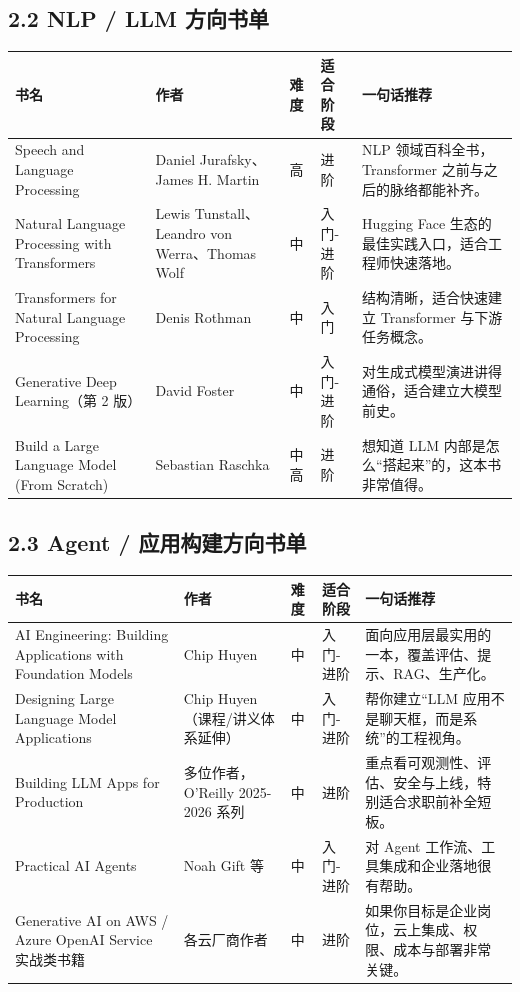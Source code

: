 \subsection{2.2 NLP / LLM 方向书单}

\begingroup
\scriptsize
\setlength{\tabcolsep}{3pt}
\begin{longtable}{|p{}|p{}|p{}|p{}|p{}|}
\hline
书名 & 作者 & 难度 & 适合阶段 & 一句话推荐 \\ \hline
Speech and Language Processing & Daniel Jurafsky、James H. Martin & 高 & 进阶 & NLP 领域百科全书，Transformer 之前与之后的脉络都能补齐。 \\ \hline
Natural Language Processing with Transformers & Lewis Tunstall、Leandro von Werra、Thomas Wolf & 中 & 入门-进阶 & Hugging Face 生态的最佳实践入口，适合工程师快速落地。 \\ \hline
Transformers for Natural Language Processing & Denis Rothman & 中 & 入门 & 结构清晰，适合快速建立 Transformer 与下游任务概念。 \\ \hline
Generative Deep Learning（第 2 版） & David Foster & 中 & 入门-进阶 & 对生成式模型演进讲得通俗，适合建立大模型前史。 \\ \hline
Build a Large Language Model (From Scratch) & Sebastian Raschka & 中高 & 进阶 & 想知道 LLM 内部是怎么``搭起来''的，这本书非常值得。 \\ \hline
\end{longtable}
\endgroup

\subsection{2.3 Agent / 应用构建方向书单}

\begingroup
\scriptsize
\setlength{\tabcolsep}{3pt}
\begin{longtable}{|p{}|p{}|p{}|p{}|p{}|}
\hline
书名 & 作者 & 难度 & 适合阶段 & 一句话推荐 \\ \hline
AI Engineering: Building Applications with Foundation Models & Chip Huyen & 中 & 入门-进阶 & 面向应用层最实用的一本，覆盖评估、提示、RAG、生产化。 \\ \hline
Designing Large Language Model Applications & Chip Huyen（课程/讲义体系延伸） & 中 & 入门-进阶 & 帮你建立``LLM 应用不是聊天框，而是系统''的工程视角。 \\ \hline
Building LLM Apps for Production & 多位作者，O'Reilly 2025-2026 系列 & 中 & 进阶 & 重点看可观测性、评估、安全与上线，特别适合求职前补全短板。 \\ \hline
Practical AI Agents & Noah Gift 等 & 中 & 入门-进阶 & 对 Agent 工作流、工具集成和企业落地很有帮助。 \\ \hline
Generative AI on AWS / Azure OpenAI Service 实战类书籍 & 各云厂商作者 & 中 & 进阶 & 如果你目标是企业岗位，云上集成、权限、成本与部署非常关键。 \\ \hline
\end{longtable}
\endgroup

